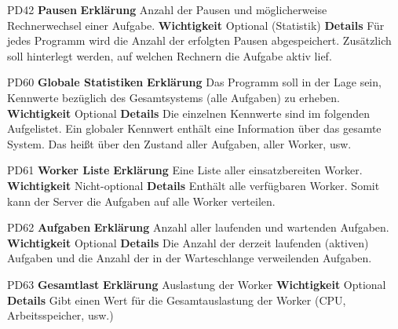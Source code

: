 \documentclass[a4paper,12pt]{article}
\begin{document}
\begin{itemize}[nosep]
\begin{minipage}[t]{\linewidth}
\item[PD42] \textbf{Pausen}
\subitem \textbf{Erklärung} Anzahl der Pausen und möglicherweise Rechnerwechsel einer Aufgabe.
\subitem \textbf{Wichtigkeit} Optional (Statistik)
\subitem \textbf{Details} Für jedes Programm wird die Anzahl der erfolgten Pausen abgespeichert.\newline
Zusätzlich soll hinterlegt werden, auf welchen Rechnern die Aufgabe aktiv lief.
\end{minipage}
\pagebreak

\begin{minipage}[t]{\linewidth}
\item[PD60] \textbf{Globale Statistiken}
\subitem \textbf{Erklärung} Das Programm soll in der Lage sein, Kennwerte bezüglich des Gesamtsystems (alle Aufgaben) zu erheben.
\subitem \textbf{Wichtigkeit} Optional
\subitem \textbf{Details} Die einzelnen Kennwerte sind im folgenden Aufgelistet.\newline
Ein globaler Kennwert enthält eine Information über das gesamte System. Das heißt über den Zustand aller Aufgaben, aller Worker, usw.
\end{minipage}
\pagebreak

\begin{minipage}[t]{\linewidth}
\item[PD61] \textbf{Worker Liste}
\subitem \textbf{Erklärung} Eine Liste aller einsatzbereiten Worker.
\subitem \textbf{Wichtigkeit} Nicht-optional
\subitem \textbf{Details} Enthält alle verfügbaren Worker.\newline
Somit kann der Server die Aufgaben auf alle Worker verteilen.
\end{minipage}
\pagebreak

\begin{minipage}[t]{\linewidth}
\item[PD62] \textbf{Aufgaben}
\subitem \textbf{Erklärung} Anzahl aller laufenden und wartenden Aufgaben.
\subitem \textbf{Wichtigkeit} Optional
\subitem \textbf{Details} Die Anzahl der derzeit laufenden (aktiven) Aufgaben und die Anzahl der in der Warteschlange verweilenden Aufgaben.
\end{minipage}
\pagebreak

\begin{minipage}[t]{\linewidth}
\item[PD63] \textbf{Gesamtlast}
\subitem \textbf{Erklärung} Auslastung der Worker
\subitem \textbf{Wichtigkeit} Optional
\subitem \textbf{Details} Gibt einen Wert für die Gesamtauslastung der Worker (CPU, Arbeitsspeicher, usw.)
\end{minipage}
\pagebreak


\end{itemize}
\end{document}
